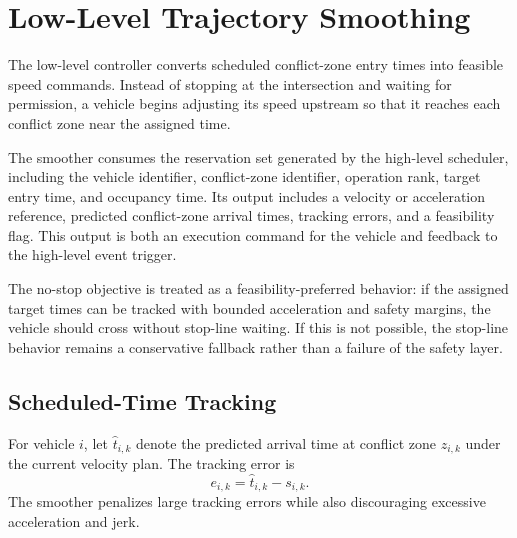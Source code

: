 \section{Low-Level Trajectory Smoothing}
\label{sec:trajectory_smoothing}

The low-level controller converts scheduled conflict-zone entry times into feasible speed commands. Instead of stopping at the intersection and waiting for permission, a vehicle begins adjusting its speed upstream so that it reaches each conflict zone near the assigned time.

\begin{addedblock}
The smoother consumes the reservation set generated by the high-level scheduler, including the vehicle identifier, conflict-zone identifier, operation rank, target entry time, and occupancy time. Its output includes a velocity or acceleration reference, predicted conflict-zone arrival times, tracking errors, and a feasibility flag. This output is both an execution command for the vehicle and feedback to the high-level event trigger.
\end{addedblock}

\begin{addedtwoblock}
The no-stop objective is treated as a feasibility-preferred behavior: if the assigned target times can be tracked with bounded acceleration and safety margins, the vehicle should cross without stop-line waiting. If this is not possible, the stop-line behavior remains a conservative fallback rather than a failure of the safety layer.
\end{addedtwoblock}

\subsection{Scheduled-Time Tracking}
For vehicle $i$, let $\hat{t}_{i,k}$ denote the predicted arrival time at conflict zone $z_{i,k}$ under the current velocity plan. The tracking error is
\begin{equation}
  e_{i,k} = \hat{t}_{i,k} - s_{i,k}.
  \label{eq:tracking_error}
\end{equation}
The smoother penalizes large tracking errors while also discouraging excessive acceleration and jerk.

